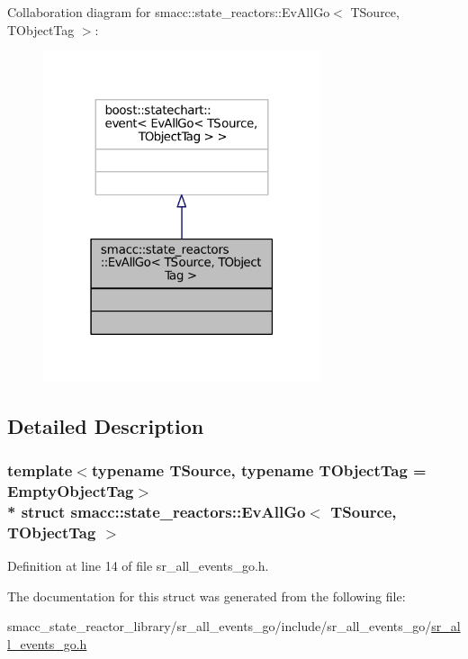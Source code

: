 Collaboration diagram for smacc\+:\+:state\+\_\+reactors\+:\+:Ev\+All\+Go$<$ T\+Source, T\+Object\+Tag $>$\+:
\nopagebreak
\begin{figure}[H]
\begin{center}
\leavevmode
\includegraphics[width=231pt]{structsmacc_1_1state__reactors_1_1EvAllGo__coll__graph}
\end{center}
\end{figure}


\subsection{Detailed Description}
\subsubsection*{template$<$typename T\+Source, typename T\+Object\+Tag = Empty\+Object\+Tag$>$\\*
struct smacc\+::state\+\_\+reactors\+::\+Ev\+All\+Go$<$ T\+Source, T\+Object\+Tag $>$}



Definition at line 14 of file sr\+\_\+all\+\_\+events\+\_\+go.\+h.



The documentation for this struct was generated from the following file\+:\begin{DoxyCompactItemize}
\item 
smacc\+\_\+state\+\_\+reactor\+\_\+library/sr\+\_\+all\+\_\+events\+\_\+go/include/sr\+\_\+all\+\_\+events\+\_\+go/\hyperlink{sr__all__events__go_8h}{sr\+\_\+all\+\_\+events\+\_\+go.\+h}\end{DoxyCompactItemize}
